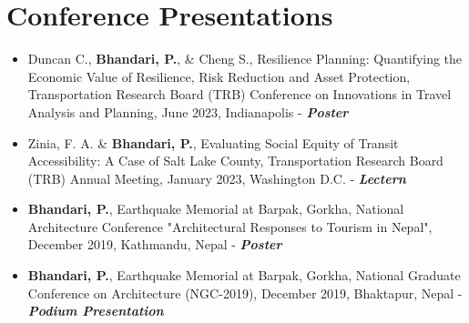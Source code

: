 \section{ \textbf{ Conference Presentations}}
    \begin{itemize}[leftmargin=0.15in, label={}]
        \item{Duncan C., \textbf{Bhandari, P.}, \& Cheng S., Resilience Planning: Quantifying the Economic Value of Resilience, Risk Reduction and Asset Protection, Transportation Research Board (TRB) Conference on Innovations in Travel Analysis and Planning, June 2023, Indianapolis - \textbf{\textit{Poster}}} \\
        \item{Zinia, F. A. \& \textbf{Bhandari, P.}, Evaluating Social Equity of Transit Accessibility: A Case of Salt Lake County, Transportation Research Board (TRB) Annual Meeting, January 2023, Washington D.C. - \textbf{\textit{Lectern}}} \\
        \item{\textbf{Bhandari, P.}, Earthquake Memorial at Barpak, Gorkha, National Architecture Conference "Architectural Responses to Tourism in Nepal", December 2019, Kathmandu, Nepal - \textbf{\textit{Poster}}} \\
        \item{\textbf{Bhandari, P.}, Earthquake Memorial at Barpak, Gorkha, National Graduate Conference on Architecture (NGC-2019), December 2019, Bhaktapur, Nepal - \textbf{\textit{Podium Presentation}}} \\
    \end{itemize}